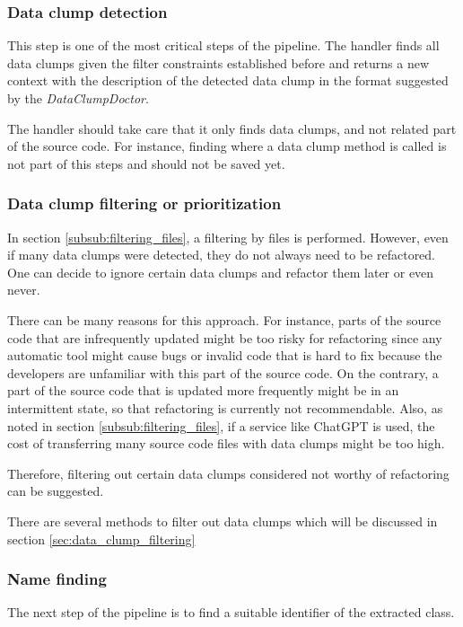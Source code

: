 \subsubsection{Data clump detection}
This step is one of the most critical steps of the pipeline. 
The handler finds all data clumps given the filter constraints established before and returns a new context with the description of the detected data clump in the format suggested by the \textit{DataClumpDoctor}. 

The handler should take care that it only finds data clumps, and not related part of the source code. For instance, finding where a data clump method is called is not part of this steps and should not be saved yet. 

\subsubsection{Data clump filtering or prioritization} \label{subsub:filtering_data_clumps}
In section \ref{subsub:filtering_files}, a filtering by files is performed. However, even if many data clumps were detected, they do not always need to be refactored. One can decide to ignore certain data clumps and refactor them later or even never. 

There can be many reasons for this approach. For instance, parts of the source code that are infrequently updated might be too risky for refactoring since any automatic tool might cause bugs or invalid code that is hard to fix because the developers are unfamiliar with this part of the source code. On the contrary, a part of the source code that is updated more frequently might be in an intermittent state, so that refactoring is currently not recommendable. Also, as noted in section  \ref{subsub:filtering_files}, if a service like ChatGPT is used, the cost of transferring many source code files with data clumps might be too high. 


Therefore, filtering out certain data clumps considered not worthy of refactoring can be suggested.

There are several methods to filter out data clumps which will be discussed in section \ref{sec:data_clump_filtering}

\subsubsection{Name finding}\label{subsec:chap3_data_clump_name_finding}
The next step of the pipeline is to find a suitable identifier of the extracted class.

